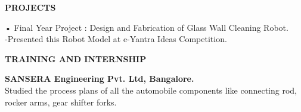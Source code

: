 \documentclass{article}
\begin{document}
\begin{center}

\textbf{\LARGE PROJECTS}
\begin{enumerate}
	
	{\large \item •	Final Year Project : Design and Fabrication of Glass Wall Cleaning Robot.\\
		-Presented this Robot Model at e-Yantra Ideas Competition.}
\end{enumerate}\vspace{15px}


\textbf{\LARGE TRAINING AND INTERNSHIP}
\begin{itemize}
	{\large \item \textbf{SANSERA Engineering Pvt. Ltd, Bangalore.}\\
		Studied the process plans of all the automobile
		components like connecting rod, rocker arms, gear shifter
		forks.}
\end{itemize}\vspace{15px}
\end{center}
\end{document}

